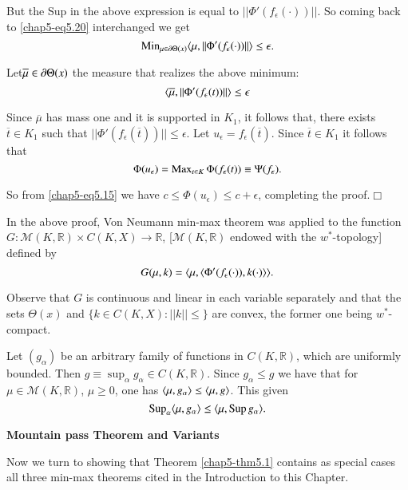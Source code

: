 But the Sup in the above expression is equal to
$||\Phi'(f_{\epsilon}(\cdot))||$. So coming back to
\eqref{chap5-eq5.20} interchanged we get
$$
\operatorname{Min}_{\mu\in\partial \Theta(x)}\langle \mu,||\Phi'(f_{\epsilon}(\cdot))||\rangle
\leq \epsilon.
$$

Let\pageoriginale $\overline{\mu}\in\partial \Theta(x)$ the measure that
realizes the above minimum:
$$
\langle \overline{\mu},||\Phi'(f_{\epsilon}(t))||\rangle\leq \epsilon
$$ 

Since $\overline{\mu}$ has mass one and it is supported in $K_{1}$, it
follows that, there exists $\overline{t}\in K_{1}$ such that
$||\Phi'(f_{\epsilon}(\overline{t}))||\leq \epsilon$. Let
$u_{\epsilon}=f_{\epsilon}(\overline{t})$. Since $\overline{t}\in
K_{1}$ it follows that
$$
\Phi(u_{\epsilon})=\operatorname{Max}_{t\in K}\Phi(f_{\epsilon}(t))\equiv
\Psi(f_{\epsilon}).
$$

So from \eqref{chap5-eq5.15} we have $c\leq \Phi(u_{\epsilon})\leq
c+\epsilon$, completing the proof.\hfill$\Box$

\setcounter{remark}{0}
\begin{remark}\label{chap5-rem1}
In the above proof, Von Neumann min-max theorem was applied to the
function $G:\mathcal{M}(K,\mathbb{R})\times C(K,X)\to \mathbb{R}$,
[$\mathcal{M}(K,\mathbb{R})$ endowed with the $w^{*}$-topology]
defined by
$$
G(\mu,k)=\langle \mu,\langle \Phi'(f_{\epsilon}(\cdot)),k(\cdot)\rangle\rangle.
$$

Observe that $G$ is continuous and linear in each variable separately
and that the sets $\Theta(x)$ and $\{k\in C(K,X):||k||\leq \}$ are
convex, the former one being $w^{*}$-compact.
\end{remark}

\begin{remark}\label{chap5-rem2}
Let $(g_{\alpha})$ be an arbitrary family of functions in
$C(K,\mathbb{R})$, which are uniformly bounded. Then $g\equiv
\sup_{\alpha}g_{\alpha}\in C(K,\mathbb{R})$. Since $g_{\alpha}\leq g$
we have that for $\mu\in\mathcal{M}(K,\mathbb{R})$, $\mu\geq 0$, one
has $\langle \mu,g_{\alpha}\rangle\leq \langle \mu,g\rangle$. This given
$$
\operatorname{Sup}_{\alpha}\langle \mu,g_{\alpha}\rangle\leq \langle \mu,\operatorname{Sup} g_{\alpha}\rangle.
$$
\end{remark}

\smallskip
\noindent
{\bf Mountain pass Theorem and Variants}
\smallskip

Now we turn to showing that Theorem \ref{chap5-thm5.1} contains as
special cases all three min-max theorems cited in the Introduction to
this Chapter.

